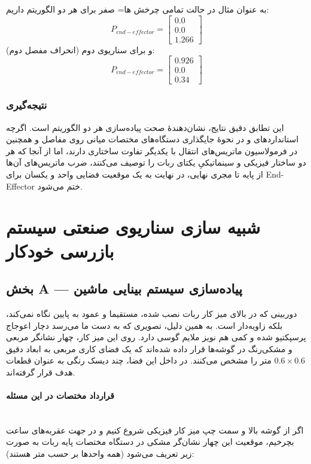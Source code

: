 \documentclass{article}
\begin{document}
به عنوان مثال در حالت تمامی چرخش ها= صفر برای هر دو الگوریتم داریم:
$$ P_{end-effector} = \begin{bmatrix} 0.0 \\ 0.0 \\ 1.266 \end{bmatrix} $$
و برای سناریوی دوم (انحراف مفصل دوم):
$$ P_{end-effector} = \begin{bmatrix} 0.926 \\ 0.0 \\ 0.34 \end{bmatrix} $$

\subsubsection{نتیجه‌گیری}
این تطابق دقیق نتایج، نشان‌دهندۀ صحت پیاده‌سازی هر دو الگوریتم است. اگرچه استانداردهای  و  در نحوۀ جایگذاری دستگاه‌های مختصات میانی  روی مفاصل و همچنین در فرمولاسیون ماتریس‌های انتقال با یکدیگر تفاوت ساختاری دارند، اما از آنجا که هر دو ساختار فیزیکی و سینماتیکیِ یکتای ربات  را توصیف می‌کنند، ضرب ماتریس‌های آن‌ها از پایه تا مجری نهایی، در نهایت به یک موقعیت فضایی واحد و یکسان برای End-Effector ختم می‌شود.

\section{شبیه سازی سناریوی صنعتی سیستم بازرسی خودکار}
\subsection{بخش A --- پیاده‌سازی سیستم بینایی ماشین }
دوربینی که در بالای میز کار ربات نصب شده، مستقیما و عمود به پایین نگاه نمی‌کند، بلکه زاویه‌دار است. به همین دلیل، تصویری که به دست ما می‌رسد دچار اعوجاج پرسپکتیو   شده و کمی هم نویز ملایم گوسی  دارد. روی این میز کار، چهار نشانگر مربعی و مشکی‌رنگ در گوشه‌ها قرار داده شده‌اند که یک فضای کاری مربعی به ابعاد دقیق $0.6 \times 0.6$ متر را مشخص می‌کنند. در داخل این فضا، چند دیسک رنگی به عنوان قطعات هدف قرار گرفته‌اند.

\paragraph{قرارداد مختصات در این مسئله}\mbox{}\\
اگر از گوشه بالا و سمت چپ میز کار فیزیکی شروع کنیم و در جهت عقربه‌های ساعت بچرخیم، موقعیت این چهار نشان‌گر مشکی در دستگاه مختصات پایه ربات به صورت زیر تعریف می‌شود (همه واحدها بر حسب متر هستند): 
\end{document}
